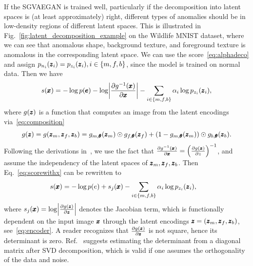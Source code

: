 If the SGVAEGAN is trained well, particularly if the decomposition into latent spaces is (at least approximately) right, different types of anomalies should be in low-density regions of different latent spaces. This is illustrated in Fig.~\ref{fig:latent_decomposition_example} on the Wildlife MNIST dataset, where we can see that anomalous shape, background texture, and foreground texture is anomalous in the corresponding latent space. We can use the score~\eqref{eq:alphadeco} and assign $p_{n_i}(\pmb{{z}}_i) = p_{z_i}(\pmb{{z}}_i), i \in \lbrace m,f,b \rbrace$, since the model is trained on normal data. Then we have
\begin{equation}
s(\vc{x}) = - \log p(\vc{e})  - \log\left\vert \frac{\partial g^{-1}(\vc{x})}{\partial \vc{x}}\right\vert -  \sum_{i\in\{m,f,b\}}\alpha_{i}\log p_{z_{i}}(\vc{z}_{i}),  
\label{eq:scorewithx}
\end{equation}
where $g(\pmb{{z}})$ is a function that computes an image from the latent encodings via~\eqref{eq:composition}
\begin{equation}
g(\pmb{{z}}) = g(\pmb{{z}}_m, \pmb{{z}}_f, \pmb{{z}}_b) = g_{m, \pmb{{\theta}}}(\pmb{{z}}_m) \odot g_{f, \pmb{{\theta}}}(\pmb{{z}}_f) + (1 - g_{m, \pmb{{\theta}}}(\pmb{{z}}_m)) \odot g_{b, \pmb{{\theta}}}(\pmb{{z}}_b).
\end{equation}
Following the derivations in~\cite{vsmidl2019anomaly}, we use the fact that $\frac{\partial g^{-1}(\vc{x})}{\partial \vc{x}} = \left( \frac{\partial g(\vc{z})}{\partial z} \right) ^{-1}$, and assume the independency of the latent spaces of $\pmb{{z}}_m, \pmb{{z}}_f, \pmb{{z}}_b$. Then Eq.~\eqref{eq:scorewithx} can be rewritten to 
\begin{align} \label{eq:scorejacodeco}  
s(\pmb{{x}}) & = - \log p(e)  + s_j(\pmb{{x}}) -  \sum_{i\in\{m,f,b\}} \alpha_{i}\log p_{z_{i}}(\pmb{{z}}_{i}),
\end{align}
where $s_j(\vc{x}) = \log \left\vert  \frac{\partial g(\vc{z})}{\partial \vc{z}}  \right\vert $ denotes the Jacobian term, which is functionally dependent on the input image $\pmb{{x}}$ through the latent encodings $\pmb{{z}} = (\pmb{{z}}_m, \pmb{{z}}_f, \pmb{{z}}_b)$, see~\eqref{eq:encoder}. A reader recognizes that $\frac{\partial g(\pmb{{z}})}{\partial \pmb{{z}}}$ is not square, hence its determinant is zero. Ref.~\cite{vsmidl2019anomaly} suggests estimating the determinant from a diagonal matrix after SVD decomposition, which is valid if one assumes the orthogonality of the data and noise.

